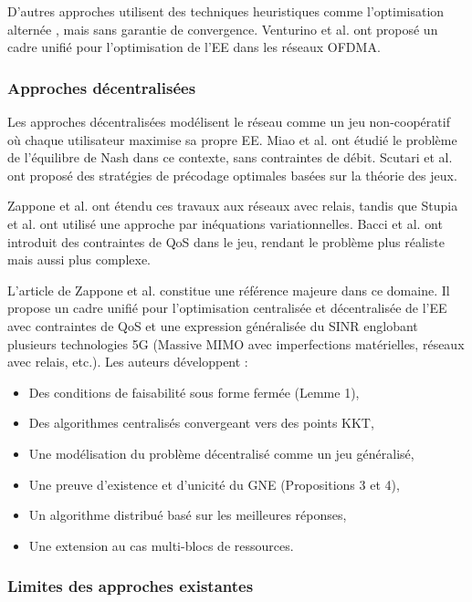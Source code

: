 \documentclass[conference]{IEEEtran}
\begin{document}
D'autres approches utilisent des techniques heuristiques comme l'optimisation alternée \cite{Du2014, He2013, He2014}, mais sans garantie de convergence. Venturino et al. \cite{Venturino2015} ont proposé un cadre unifié pour l'optimisation de l'EE dans les réseaux OFDMA.

\subsubsection{Approches décentralisées}

Les approches décentralisées modélisent le réseau comme un jeu non-coopératif où chaque utilisateur maximise sa propre EE. Miao et al. \cite{Miao2011} ont étudié le problème de l'équilibre de Nash dans ce contexte, sans contraintes de débit. Scutari et al. \cite{Scutari2008} ont proposé des stratégies de précodage optimales basées sur la théorie des jeux.

Zappone et al. \cite{Zappone2013} ont étendu ces travaux aux réseaux avec relais, tandis que Stupia et al. \cite{Stupia2015} ont utilisé une approche par inéquations variationnelles. Bacci et al. \cite{Bacci2015} ont introduit des contraintes de QoS dans le jeu, rendant le problème plus réaliste mais aussi plus complexe.

L'article de Zappone et al. \cite{Zappone2021} constitue une référence majeure dans ce domaine. Il propose un cadre unifié pour l'optimisation centralisée et décentralisée de l'EE avec contraintes de QoS et une expression généralisée du SINR englobant plusieurs technologies 5G (Massive MIMO avec imperfections matérielles, réseaux avec relais, etc.). Les auteurs développent :
\begin{itemize}
    \item Des conditions de faisabilité sous forme fermée (Lemme 1),
    \item Des algorithmes centralisés convergeant vers des points KKT,
    \item Une modélisation du problème décentralisé comme un jeu généralisé,
    \item Une preuve d'existence et d'unicité du GNE (Propositions 3 et 4),
    \item Un algorithme distribué basé sur les meilleures réponses,
    \item Une extension au cas multi-blocs de ressources.
\end{itemize}

\subsubsection{Limites des approches existantes}
\end{document}
